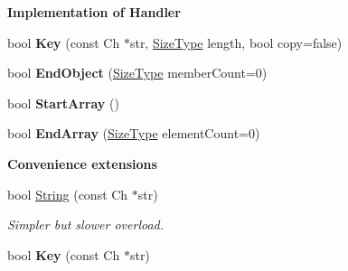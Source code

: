 \begin{Indent}{\bf Implementation of Handler}
\begin{DoxyCompactItemize}
\item 
\hypertarget{class_writer_a88f8aa2df45426ba81d293ddc71698af}{}bool {\bfseries Key} (const Ch $\ast$str, \hyperlink{rapidjson_8h_a5ed6e6e67250fadbd041127e6386dcb5}{Size\+Type} length, bool copy=false)\label{class_writer_a88f8aa2df45426ba81d293ddc71698af}

\item 
\hypertarget{class_writer_a3705f6d3f9a820f0a6652089222ed3ac}{}bool {\bfseries End\+Object} (\hyperlink{rapidjson_8h_a5ed6e6e67250fadbd041127e6386dcb5}{Size\+Type} member\+Count=0)\label{class_writer_a3705f6d3f9a820f0a6652089222ed3ac}

\item 
\hypertarget{class_writer_a8a981ed4f5618a545724789ee4c8dedb}{}bool {\bfseries Start\+Array} ()\label{class_writer_a8a981ed4f5618a545724789ee4c8dedb}

\item 
\hypertarget{class_writer_ad8680f9f8d3289dad72f1f18a8763aa1}{}bool {\bfseries End\+Array} (\hyperlink{rapidjson_8h_a5ed6e6e67250fadbd041127e6386dcb5}{Size\+Type} element\+Count=0)\label{class_writer_ad8680f9f8d3289dad72f1f18a8763aa1}

\end{DoxyCompactItemize}
\end{Indent}
\begin{Indent}{\bf Convenience extensions}\par
\begin{DoxyCompactItemize}
\item 
\hypertarget{class_writer_ad1525690e1d598d7e32892b8b83fbcd4}{}bool \hyperlink{class_writer_ad1525690e1d598d7e32892b8b83fbcd4}{String} (const Ch $\ast$str)\label{class_writer_ad1525690e1d598d7e32892b8b83fbcd4}

\begin{DoxyCompactList}\small\item\em Simpler but slower overload. \end{DoxyCompactList}\item 
\hypertarget{class_writer_a77dbb4676e57aab1c0e976ec22145fb9}{}bool {\bfseries Key} (const Ch $\ast$str)\label{class_writer_a77dbb4676e57aab1c0e976ec22145fb9}

\end{DoxyCompactItemize}
\end{Indent}
